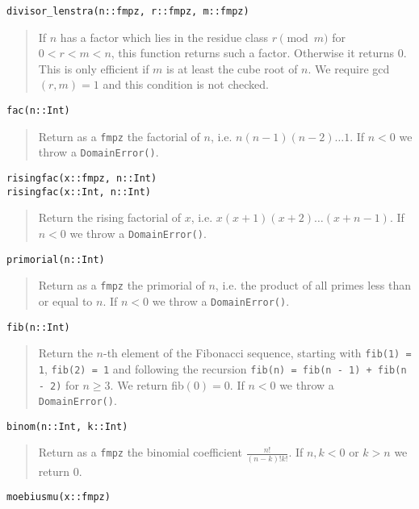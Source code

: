 \documentclass[a4paper,10pt]{article}
\newcommand{\code}{\lstinline}
\newcommand{\desc}[1]{\vspace{-3mm}\begin{quote}#1\end{quote}}
\begin{document}
{{\begin{lstlisting}
divisor_lenstra(n::fmpz, r::fmpz, m::fmpz)
\end{lstlisting}

\desc{If $n$ has a factor which lies in the residue class $r \pmod{m}$ for $0 < r < m < n$,
this function returns such a factor. Otherwise it returns $0$. This is only efficient if 
$m$ is at least the cube root of $n$. We require gcd$(r, m) = 1$ and this condition is not
checked.}

\begin{lstlisting}
fac(n::Int)
\end{lstlisting}

\desc{Return as a \code{fmpz} the factorial of $n$, i.e. $n(n - 1)(n - 2)\ldots 1$.
If $n < 0$ we throw a \code{DomainError()}.}

\begin{lstlisting}
risingfac(x::fmpz, n::Int)
risingfac(x::Int, n::Int)
\end{lstlisting}

\desc{Return the rising factorial of $x$, i.e. $x(x + 1)(x + 2)\ldots (x + n - 1)$.
If $n < 0$ we throw a \code{DomainError()}.}

\begin{lstlisting}
primorial(n::Int)
\end{lstlisting}

\desc{Return as a \code{fmpz} the primorial of $n$, i.e. the product of all primes
less than or equal to $n$. If $n < 0$ we throw a \code{DomainError()}.}

\begin{lstlisting}
fib(n::Int)
\end{lstlisting}

\desc{Return the $n$-th element of the Fibonacci sequence, starting with 
\code{fib(1) = 1}, \code{fib(2) = 1} and following the recursion 
\code{fib(n) = fib(n - 1) + fib(n - 2)} for $n \geq 3$.
We return fib$(0) = 0$. If $n < 0$ we throw a \code{DomainError()}.}

\begin{lstlisting}
binom(n::Int, k::Int)
\end{lstlisting}

\desc{Return as a \code{fmpz} the binomial coefficient $\frac{n!}{(n - k)!k!}$. If
$n, k < 0$ or $k > n$ we return $0$.}

\begin{lstlisting}
moebiusmu(x::fmpz)
\end{lstlisting}

}}
\end{document}
